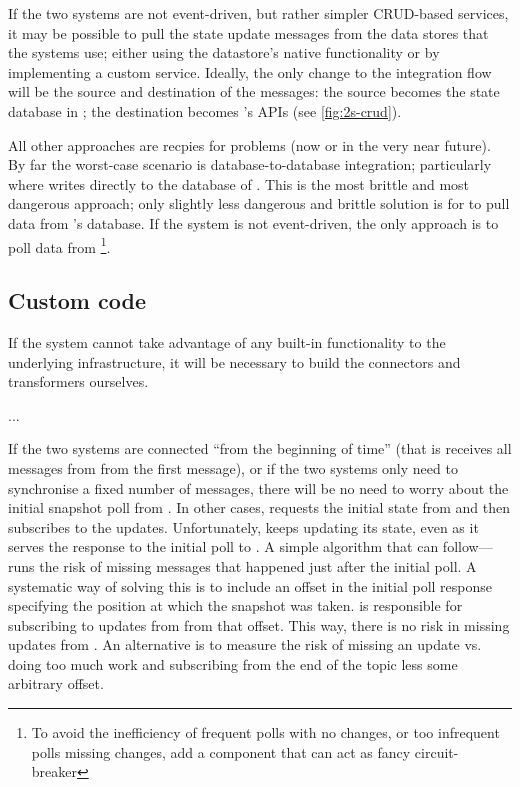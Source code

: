 If the two systems are not event-driven, but rather simpler CRUD-based services, it may be possible to pull the state update messages from the data stores that the systems use; either using the datastore's native functionality or by implementing a custom service. Ideally, the only change to the integration flow will be the source and destination of the messages: the source becomes the state database in ; the destination becomes 's APIs (see \autoref{fig:2s-crud}). 


All other approaches are recpies for problems (now or in the very near future). By far the worst-case scenario is database-to-database integration; particularly where  writes directly to the database of . This is the most brittle and most dangerous approach; only slightly less dangerous and brittle solution is for  to pull data from 's database. If the system  is not event-driven, the only approach is to poll data from \footnote{To avoid the inefficiency of frequent polls with no changes, or too infrequent polls missing changes, add a component that can act as fancy circuit-breaker}. 

\subsection{Custom code}
If the system cannot take advantage of any built-in functionality to the underlying infrastructure, it will be necessary to build the connectors and transformers ourselves. 

...

If the two systems are connected ``from the beginning of time'' (that is  receives all messages from  from the first message), or if the two systems only need to synchronise a fixed number of messages, there will be no need to worry about the initial snapshot poll from . In other cases,  requests the initial state from  and then subscribes to the updates. Unfortunately,  keeps updating its state, even as it serves the response to the initial poll to . A simple algorithm that  can follow----runs the risk of missing messages that happened just after the initial poll. A systematic way of solving this is to include an offset in the initial poll response specifying the position at which the snapshot was taken.  is responsible for subscribing to updates from  from that offset. This way, there is no risk in missing updates from . An alternative is to measure the risk of missing an update vs. doing too much work and subscribing from the end of the topic less some arbitrary offset.



